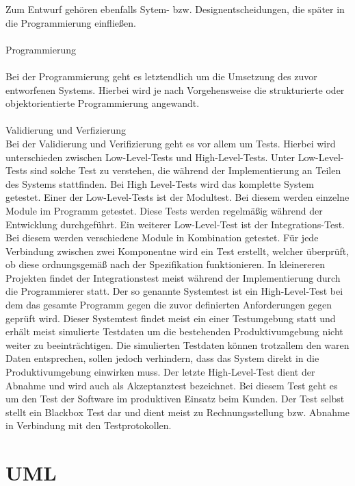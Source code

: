 Zum Entwurf gehören ebenfalls Sytem- bzw. Designentscheidungen, die später in die Programmierung einfließen.
\\
\\
Programmierung\\
\\
Bei der Programmierung geht es letztendlich um die Umsetzung des zuvor entworfenen Systems. Hierbei wird je nach Vorgehensweise die strukturierte oder objektorientierte Programmierung angewandt.
\\
\\
Validierung und Verfizierung
\\
Bei der Validierung  und Verifizierung geht es vor allem um Tests. Hierbei wird unterschieden zwischen Low-Level-Tests und High-Level-Tests. Unter Low-Level-Tests sind solche Test zu verstehen, die während der Implementierung an Teilen des Systems stattfinden. Bei High Level-Tests wird das komplette System getestet. Einer der Low-Level-Tests ist der Modultest. Bei diesem werden einzelne Module im Programm getestet.  Diese Tests werden regelmäßig während der Entwicklung durchgeführt. Ein weiterer Low-Level-Test ist der Integrations-Test. Bei diesem werden verschiedene Module in Kombination getestet. Für jede Verbindung zwischen zwei Komponentne wird ein Test erstellt, welcher überprüft, ob diese ordnungsgemäß nach der Spezifikation funktionieren. In kleinereren Projekten findet der Integrationstest meist während der Implementierung durch die Programmierer statt.
Der so genannte Systemtest ist ein High-Level-Test bei dem das gesamte Programm gegen die zuvor definierten Anforderungen gegen geprüft wird. Dieser Systemtest findet meist ein einer Testumgebung statt und erhält meist simulierte Testdaten um die bestehenden Produktivumgebung nicht weiter zu beeinträchtigen. Die simulierten Testdaten können trotzallem den waren Daten entsprechen, sollen jedoch verhindern, dass das System direkt in die Produktivumgebung einwirken muss.
Der letzte High-Level-Test dient der Abnahme und wird auch als Akzeptanztest bezeichnet. Bei diesem Test geht es um den Test der Software im produktiven Einsatz beim Kunden. Der Test selbst stellt ein Blackbox Test dar und dient meist zu Rechnungsstellung bzw. Abnahme in Verbindung mit den Testprotokollen.

\section{UML}
\label{sec:uml}

